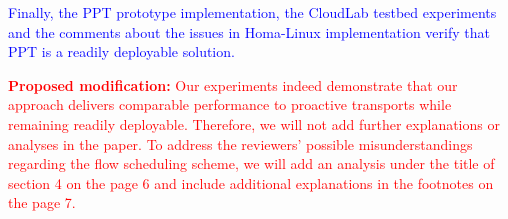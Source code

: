 \documentclass[12pt,one-column]{article}
\begin{document}
\textcolor{blue}{Finally, the PPT prototype implementation, the CloudLab testbed experiments and the comments about the issues in Homa-Linux implementation verify that PPT is a readily deployable solution.
}

\noindent\textcolor{red}{\textbf{Proposed modification: }
Our experiments indeed demonstrate that our approach delivers comparable performance to proactive transports while remaining readily deployable. Therefore, we will not add further explanations or analyses in the paper. To address the reviewers' possible misunderstandings regarding the flow scheduling scheme, we will add an analysis under the title of section 4 on the page 6 and include additional explanations in the footnotes on the page 7.
}


\end{document}
